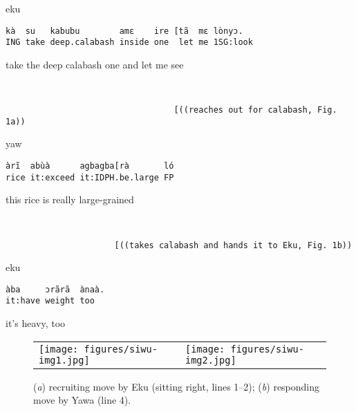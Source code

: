 \documentclass[output=paper]{langsci/langscibook}
\begin{document}
\vspace{-1mm}
%
\begin{mdframednoverticalspace}[style=firstfoc]
\begin{transbox}{1}{eku}
\begin{verbatim}
kà  su   kabubu        amɛ    ire [tã  mɛ lònyɔ.
ING take deep.calabash inside one  let me 1SG:look
\end{verbatim}
take the deep calabash one and let me see
\end{transbox}
\end{mdframednoverticalspace}
%
\begin{mdframednoverticalspace}[style=firstfoc]
\begin{transbox}{2}{~}
\begin{verbatim}
                                  [((reaches out for calabash, Fig. 1a))
\end{verbatim}
\end{transbox}
\end{mdframednoverticalspace}
%
\begin{transbox}{3}{yaw}
\begin{verbatim}
àrĩ  abùà      agbagba[rà       ló
rice it:exceed it:IDPH.be.large FP
\end{verbatim}
{this} rice is really large-grained
\end{transbox}
%
\begin{mdframednoverticalspace}[style=secondfoc]
\begin{transbox}{4}{~}
\begin{verbatim}
                      [((takes calabash and hands it to Eku, Fig. 1b))
\end{verbatim}
\end{transbox}
\end{mdframednoverticalspace}\vspace{-2mm}
%
\begin{transbox}{5}{eku}
\begin{verbatim}
àba     ɔrãrã  ànaà.
it:have weight too
\end{verbatim}
it’s heavy, too
\end{transbox}

\begin{figure}
\begin{tabularx}{\textwidth}{ll}
\centering
\texttt{[image: figures/siwu-img1.jpg]} & \texttt{[image: figures/siwu-img2.jpg]}
\end{tabularx}

\caption{(\textit{a}) recruiting move by Eku (sitting right, lines 1--2); (\textit{b}) responding move by Yawa (line 4).}
\label{fig:dingemanse:1}
\end{figure}
\end{document}
